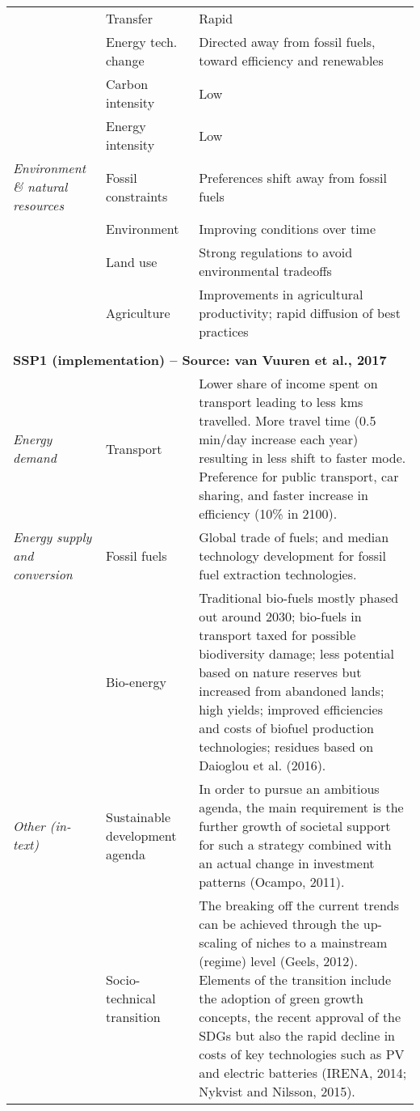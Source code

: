 {\begin{longtable}{p{3cm}p{3.5cm}p{8cm}}
\textit{} & Transfer & Rapid\\
\textit{} & Energy tech. change & Directed away from fossil fuels, toward efficiency and renewables\\
\textit{} & Carbon intensity & Low\\
\textit{} & Energy intensity & Low\\
\textit{Environment \& natural resources} & Fossil constraints & Preferences shift away from fossil fuels\\
\textit{} & Environment & Improving conditions over time\\
\textit{} & Land use & Strong regulations to avoid environmental tradeoffs\\
\textit{} & Agriculture & Improvements in agricultural productivity; rapid diffusion of best practices\\ && \\
\multicolumn{3}{l}{\textbf{SSP1 (implementation) -- Source: van Vuuren et al., 2017}}\\
\textit{Energy demand} & Transport & Lower share of income spent on transport leading to less kms travelled. More travel time (0.5 min/day increase each year) resulting in less shift to faster mode. Preference for public transport, car sharing, and faster increase in efficiency (10\% in 2100).\\
\textit{Energy supply and conversion} & Fossil fuels & Global trade of fuels; and median technology development for fossil fuel extraction technologies.\\
\textit{} & Bio-energy & Traditional bio-fuels mostly phased out around 2030; bio-fuels in transport taxed for possible biodiversity damage; less potential based on nature reserves but increased from abandoned lands; high yields; improved efficiencies and costs of biofuel production technologies; residues based on Daioglou et al. (2016).\\
\textit{Other (in-text)} & Sustainable development agenda & In order to pursue an ambitious agenda, the main requirement is the further growth of societal support for such a strategy combined with an actual change in investment patterns (Ocampo, 2011).\\
\textit{} & Socio-technical transition & The breaking off the current trends can be achieved through the up-scaling of niches to a mainstream (regime) level (Geels, 2012). Elements of the transition include the adoption of green growth concepts, the recent approval of the SDGs but also the rapid decline in costs of key technologies such as PV and electric batteries (IRENA, 2014; Nykvist and Nilsson, 2015).\\

\end{longtable}}

